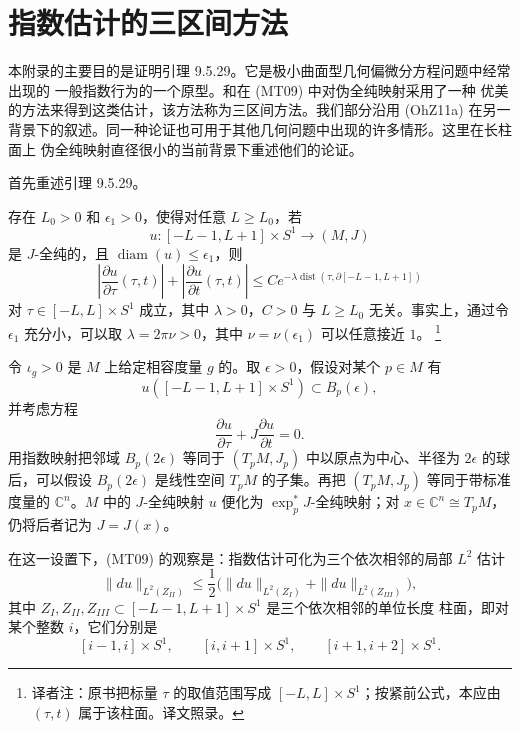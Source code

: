 \chapter{指数估计的三区间方法}
\label{app:three-interval}
\appendixsectionlessstatements

本附录的主要目的是证明引理 9.5.29。它是极小曲面型几何偏微分方程问题中经常出现的
一般指数行为的一个原型。\personIgnasiMundetIRiera{}和\personTian{}在 (MT09) 中对伪全纯映射采用了一种
优美的方法来得到这类估计，该方法称为三区间方法。我们部分沿用 (OhZ11a) 在另一
背景下的叙述。同一种论证也可用于其他几何问题中出现的许多情形。这里在长柱面上
伪全纯映射直径很小的当前背景下重述他们的论证。

首先重述引理 9.5.29。

\begin{lemma}
\label{lem:app-b-main-decay}
存在 $L_0>0$ 和 $\epsilon_1>0$，使得对任意 $L\geq L_0$，若
\[
 u\colon[-L-1,L+1]\times S^1\longrightarrow(M,J)
\]
是 $J$-全纯的，且 $\operatorname{diam}(u)\leq\epsilon_1$，则
\[
 \left|\frac{\partial u}{\partial\tau}(\tau,t)\right|
 +\left|\frac{\partial u}{\partial t}(\tau,t)\right|
 \leq Ce^{-\lambda\operatorname{dist}(\tau,\partial[-L-1,L+1])}
\]
对 $\tau\in[-L,L]\times S^1$ 成立，其中 $\lambda>0$，$C>0$ 与
$L\geq L_0$ 无关。事实上，通过令 $\epsilon_1$ 充分小，可以取
$\lambda=2\pi\nu>0$，其中 $\nu=\nu(\epsilon_1)$ 可以任意接近 $1$。
\footnote{译者注：原书把标量 $\tau$ 的取值范围写成
$[-L,L]\times S^1$；按紧前公式，本应由 $(\tau,t)$ 属于该柱面。译文照录。}
\end{lemma}

令 $\iota_g>0$ 是 $M$ 上给定相容度量 $g$ 的\termInjectivityRadius{}。取
$\epsilon>0$，假设对某个 $p\in M$ 有
\[
 u([-L-1,L+1]\times S^1)\subset B_p(\epsilon),
\]
并考虑方程
\[
 \frac{\partial u}{\partial\tau}+J\frac{\partial u}{\partial t}=0.
\]
用指数映射把邻域 $B_p(2\epsilon)$ 等同于 $(T_pM,J_p)$ 中以原点为中心、半径为
$2\epsilon$ 的球后，可以假设 $B_p(2\epsilon)$ 是线性空间 $T_pM$ 的子集。再把
$(T_pM,J_p)$ 等同于带标准度量的 $\mathbb C^n$。$M$ 中的 $J$-全纯映射 $u$ 便化为
$\exp_p^*J$-全纯映射；对 $x\in\mathbb C^n\cong T_pM$，仍将后者记为
$J=J(x)$。

在这一设置下，(MT09) 的观察是：指数估计可化为三个依次相邻的局部 $L^2$ 估计
\begin{equation}
\label{eq:app-b-three-cylinder-local}
 \|du\|_{L^2(Z_{II})}
 \leq\frac12\bigl(\|du\|_{L^2(Z_I)}+\|du\|_{L^2(Z_{III})}\bigr),
\end{equation}
其中 $Z_I,Z_{II},Z_{III}\subset[-L-1,L+1]\times S^1$ 是三个依次相邻的单位长度
柱面，即对某个整数 $i$，它们分别是
\[
 [i-1,i]\times S^1,\qquad[i,i+1]\times S^1,
 \qquad[i+1,i+2]\times S^1.
\]

